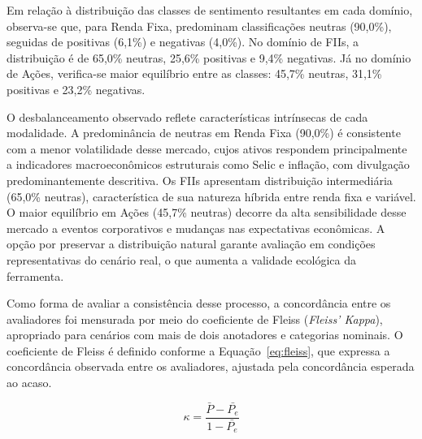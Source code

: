 \documentclass[12pt]{article}
\begin{document}
Em relação à distribuição das classes de sentimento resultantes em cada domínio, observa-se que, para Renda Fixa, predominam classificações neutras (90,0\%), seguidas de positivas (6,1\%) e negativas (4,0\%). No domínio de FIIs, a distribuição é de 65,0\% neutras, 25,6\% positivas e 9,4\% negativas. Já no domínio de Ações, verifica-se maior equilíbrio entre as classes: 45,7\% neutras, 31,1\% positivas e 23,2\% negativas.

O desbalanceamento observado reflete características intrínsecas de cada modalidade. A predominância de neutras em Renda Fixa (90,0\%) é consistente com a menor volatilidade 
desse mercado, cujos ativos respondem principalmente a indicadores macroeconômicos estruturais como Selic e inflação, com divulgação predominantemente descritiva. Os FIIs apresentam distribuição 
intermediária (65,0\% neutras), característica de sua natureza híbrida entre renda fixa e variável. O maior equilíbrio em Ações (45,7\% neutras) decorre da alta sensibilidade desse mercado a eventos
corporativos e mudanças nas expectativas econômicas. A opção por preservar a distribuição natural garante avaliação em condições representativas do cenário real, o que aumenta a validade ecológica da ferramenta.

Como forma de avaliar a consistência desse processo, a concordância entre os avaliadores foi mensurada por meio do coeficiente de Fleiss (\textit{Fleiss' Kappa}), apropriado para cenários com mais de dois anotadores e categorias nominais.  O coeficiente de Fleiss é definido conforme a Equação~\ref{eq:fleiss}, que expressa a concordância observada entre os avaliadores, ajustada pela concordância esperada ao acaso.

\begin{equation}
\kappa = \frac{\bar{P} - \bar{P_e}}{1 - \bar{P_e}}
\label{eq:fleiss}
\end{equation}

\end{document}
